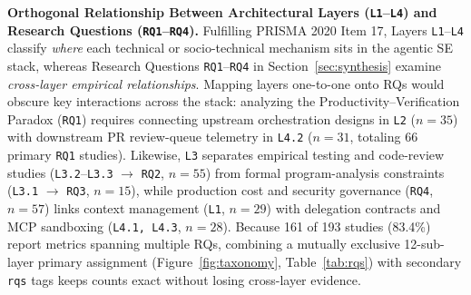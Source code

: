 \documentclass[10pt,twocolumn,a4paper]{article}
\begin{document}
\textbf{Orthogonal Relationship Between Architectural Layers (\texttt{L1}--\texttt{L4}) and Research Questions (\texttt{RQ1}--\texttt{RQ4}).} Fulfilling PRISMA 2020 Item 17, Layers \texttt{L1}--\texttt{L4} classify \emph{where} each technical or socio-technical mechanism sits in the agentic SE stack, whereas Research Questions \texttt{RQ1}--\texttt{RQ4} in Section~\ref{sec:synthesis} examine \emph{cross-layer empirical relationships}. Mapping layers one-to-one onto RQs would obscure key interactions across the stack: analyzing the Productivity--Verification Paradox (\texttt{RQ1}) requires connecting upstream orchestration designs in \texttt{L2} ($n=35$) with downstream PR review-queue telemetry in \texttt{L4.2} ($n=31$, totaling $66$ primary \texttt{RQ1} studies). Likewise, \texttt{L3} separates empirical testing and code-review studies (\texttt{L3.2}--\texttt{L3.3} $\to$ \texttt{RQ2}, $n=55$) from formal program-analysis constraints (\texttt{L3.1} $\to$ \texttt{RQ3}, $n=15$), while production cost and security governance (\texttt{RQ4}, $n=57$) links context management (\texttt{L1}, $n=29$) with delegation contracts and MCP sandboxing (\texttt{L4.1, L4.3}, $n=28$). Because 161 of 193 studies (83.4\%) report metrics spanning multiple RQs, combining a mutually exclusive 12-sub-layer primary assignment (Figure~\ref{fig:taxonomy}, Table~\ref{tab:rqs}) with secondary \texttt{rqs} tags keeps counts exact without losing cross-layer evidence.
\end{document}
